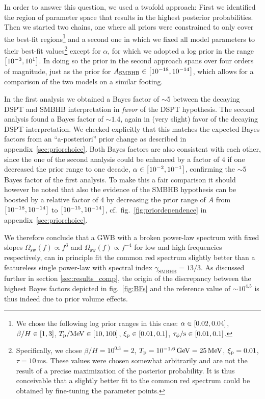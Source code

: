 	In order to answer this question, we used a twofold approach: First we identified the region of parameter space that results in the highest posterior probabilities. Then we started two chains, one where all priors were constrained to only cover the best-fit regions\footnote{We chose the following log prior ranges in this case: $\alpha \in \left[ 0.02, 0.04 \right]$, $\beta/H \in \left[ 1, 3 \right]$, $T_{\text{p}} / \text{MeV} \in \left[ 10, 100 \right]$, $\xi_{\text{p}} \in \left[ 0.01, 0.1 \right]$, $\tau_\phi / \text{s} \in \left[ 0.01, 0.1 \right]$.} and a second one in which we fixed all model parameters to their best-fit values\footnote{Specifically, we chose $\beta/H = 10^{0.3} = 2$, $T_{\text{p}} = 10^{-1.6} \, \text{GeV} = 25 \, \text{MeV}$, $\xi_{\text{p}} = 0.01$, $\tau = 10 \, \text{ms}$. These values were chosen somewhat arbitrarily and are not the result of a precise maximization of the posterior probability. It is thus conceivable that a slightly better fit to the common red spectrum could be obtained by fine-tuning the parameter points.} except   for $\alpha$, for which we adopted a log prior in the range $\left[ 10^{-3}, 10^{1} \right]$. In doing so the prior in the second approach spans over four orders of magnitude, just as the prior for $A_\text{SMBHB} \in \left[ 10^{-18}, 10^{-14} \right]$, which allows for a comparison of the two models on a similar footing.
	
	In the first analysis we obtained a Bayes factor of $\sim5$ between the decaying \ac{DSPT} and \ac{SMBHB} interpretation in \textit{favor} of the \ac{DSPT} hypothesis. The second analysis found a Bayes factor of $\sim1.4$, again in (very slight) favor of the decaying \ac{DSPT} interpretation. We checked explicitly that this matches the expected  Bayes factors from an ``a-posteriori'' prior change as described in appendix~\ref{sec:priorchoice}. Both Bayes factors are also consistent with each other, since the one of the second analysis could be enhanced by a factor of $4$ if one decreased the prior range to one decade, $\alpha \in \left[ 10^{-2}, 10^{-1} \right]$, confirming the $\sim5$ Bayes factor of the first analysis. To make this a fair comparison it should however be noted that also the evidence of the \ac{SMBHB} hypothesis can be boosted by a relative factor of $4$ by decreasing the prior range of $A$ from $\left[ 10^{-18}, 10^{-14} \right]$ to $\left[ 10^{-15}, 10^{-14} \right]$, cf.~fig.~\ref{fig:priordependence} in appendix~\ref{sec:priorchoice}.
	
	We therefore conclude that a \ac{GWB} with a broken power-law spectrum with fixed slopes $\Omega_\text{sw}(f) \propto f^3$ and 
	$\Omega_\text{sw}(f) \propto f^{-4}$ for low and high   frequencies respectively, can in principle fit the common red spectrum slightly better than a featureless single power-law with spectral index $\gamma_\text{SMBHB} = 13/3$. As discussed further in section \ref{sec:results_comp}, the origin of the discrepancy between the highest Bayes factors depicted in fig.~\ref{fig:BFs} and the reference value of $\sim10^{4.5}$ is thus indeed due to prior volume effects. 
	
